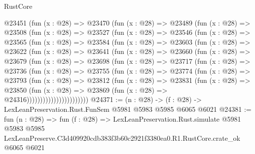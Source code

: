 \begin{lexlean}{RustCore}
\begin{coremodule}
  @23451
    (fun (x : @28) =>
    @23470
      (fun (x : @28) =>
      @23489
        (fun (x : @28) =>
        @23508
          (fun (x : @28) =>
          @23527
            (fun (x : @28) =>
            @23546
              (fun (x : @28) =>
              @23565
                (fun (x : @28) =>
                @23584
                  (fun (x : @28) =>
                  @23603
                    (fun (x : @28) =>
                    @23622
                      (fun (x : @28) =>
                      @23641
                        (fun (x : @28) =>
                        @23660
                          (fun (x : @28) =>
                          @23679
                            (fun (x : @28) =>
                            @23698
                              (fun (x : @28) =>
                              @23717
                                (fun (x : @28) =>
                                @23736
                                  (fun (x : @28) =>
                                  @23755
                                    (fun (x : @28) =>
                                    @23774
                                      (fun (x : @28) =>
                                      @23793
                                        (fun (x : @28) =>
                                        @23812
                                          (fun (x : @28) =>
                                          @23831
                                            (fun (x : @28) =>
                                            @23850
                                              (fun (x : @28) =>
                                              @23869 (fun (x : @28) => @24316)))))))))))))))))))))))
@24371 := (n : @28) -> (f : @28) -> LexLeanPreservation.Rust.FunSem @5981 @5983 @5985 @6065 @6021
@24381 := fun (n : @28) =>
  fun (f : @28) =>
  LexLeanPreservation.Rust.simulate
    @5981
    @5983
    @5985
    LexLeanPreserve.C3d409920cdb383f3b60c2921f3380ea0.R1.RustCore.crate_ok
    @6065
    @6021
\end{coremodule}
\end{lexlean}
